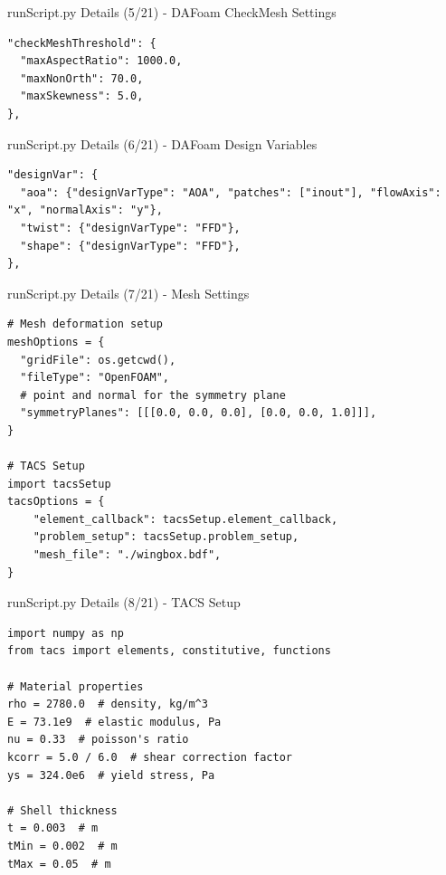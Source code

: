 \documentclass{bredelebeamer}
\begin{document}
\begin{frame}[fragile]{runScript.py Details (5/21) - \large DAFoam CheckMesh Settings}
\scriptsize
\lstset{ language=bash }
\begin{lstlisting}
"checkMeshThreshold": {
  "maxAspectRatio": 1000.0,
  "maxNonOrth": 70.0,
  "maxSkewness": 5.0,
},
\end{lstlisting}
\normalsize
\end{frame}

\begin{frame}[fragile]{runScript.py Details (6/21) - \large DAFoam Design Variables}
\scriptsize
\lstset{ language=bash }
\begin{lstlisting}
"designVar": {
  "aoa": {"designVarType": "AOA", "patches": ["inout"], "flowAxis": "x", "normalAxis": "y"},
  "twist": {"designVarType": "FFD"},
  "shape": {"designVarType": "FFD"},
},
\end{lstlisting}
\normalsize
\end{frame}

\begin{frame}[fragile]{runScript.py Details (7/21) - \large Mesh Settings}
\scriptsize
\lstset{ language=bash }
\begin{lstlisting}
# Mesh deformation setup
meshOptions = {
  "gridFile": os.getcwd(),
  "fileType": "OpenFOAM",
  # point and normal for the symmetry plane
  "symmetryPlanes": [[[0.0, 0.0, 0.0], [0.0, 0.0, 1.0]]],
}

# TACS Setup
import tacsSetup
tacsOptions = {
    "element_callback": tacsSetup.element_callback,
    "problem_setup": tacsSetup.problem_setup,
    "mesh_file": "./wingbox.bdf",
}
\end{lstlisting}
\normalsize
\end{frame}

\begin{frame}[fragile]{runScript.py Details (8/21) - \large TACS Setup}
 \scriptsize
\lstset{ language=bash }
\begin{lstlisting}
import numpy as np
from tacs import elements, constitutive, functions

# Material properties
rho = 2780.0  # density, kg/m^3
E = 73.1e9  # elastic modulus, Pa
nu = 0.33  # poisson's ratio
kcorr = 5.0 / 6.0  # shear correction factor
ys = 324.0e6  # yield stress, Pa

# Shell thickness
t = 0.003  # m
tMin = 0.002  # m
tMax = 0.05  # m
\end{lstlisting}
\normalsize
\end{frame}
\end{document}
